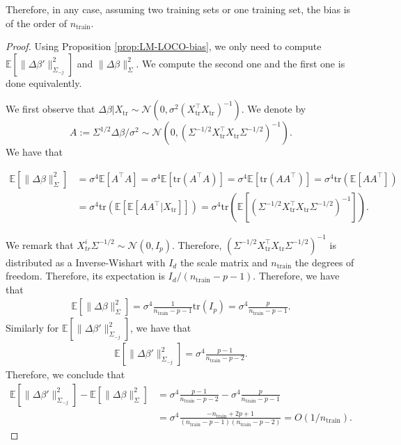 \documentclass{article}
\theoremstyle{plain}
\theoremstyle{definition}
\theoremstyle{remark}
\newcommand{\e}[1]{\mathbb{E}\left[#1\right]  } %
\begin{document}
Therefore, in any case, assuming two training sets or one training set, the bias is of the order of $n_\mathrm{train}$.

\begin{proof}
Using Proposition \ref{prop:LM-LOCO-bias}, we only need to compute $\e{\|\Delta\beta'\|^2_{\Sigma_{-j}}}$ and $\|\Delta\beta\|^2_\Sigma$. We compute the second one and the first one is done equivalently.

We first observe that $\Delta\beta| X_\mathrm{tr}\sim\mathcal{N}(0, \sigma^2(X_\mathrm{tr}^\top X_\mathrm{tr})^{-1})$. We denote by $$A:=\Sigma^{1/2}\Delta\beta/\sigma^2\sim \mathcal{N}(0, (\Sigma^{-1/2}X_\mathrm{tr}^\top X_\mathrm{tr}\Sigma^{-1/2})^{-1}).$$ We have that 

\begin{align*}
    \e{\|\Delta\beta\|^2_{\Sigma}}&= \sigma^4\e{A^\top A} = \sigma^4 \e{\mathrm{tr}(A^\top A)}= \sigma^4 \e{\mathrm{tr}(A A^\top)} = 
    \sigma^4 \mathrm{tr}(\e{A A^\top})\\&=  \sigma^4 \mathrm{tr}(\e{\e{A A^\top|X_\mathrm{tr}}})=  \sigma^4 \mathrm{tr}(\e{(\Sigma^{-1/2}X_\mathrm{tr}^\top X_\mathrm{tr}\Sigma^{-1/2})^{-1}}).
\end{align*}

We remark that $X_{tr}^i\Sigma^{-1/2}\sim \mathcal{N}(0, I_{p})$. 
Therefore, $(\Sigma^{-1/2}X_\mathrm{tr}^\top X_\mathrm{tr}\Sigma^{-1/2})^{-1}$ is distributed as a Inverse-Wishart with $I_d$ the scale matrix and $n_\mathrm{train}$ the degrees of freedom. Therefore, its expectation is $I_d/(n_\mathrm{train}-p-1)$. Therefore, we have that 
\begin{align*}
    \e{\|\Delta\beta\|^2_{\Sigma}} = \sigma^4\frac{1}{n_\mathrm{train}-p-1}\mathrm{tr}(I_p)=\sigma^4\frac{p}{n_\mathrm{train}-p-1}.
\end{align*}
Similarly for $\e{\|\Delta\beta'\|^2_{\Sigma_{-j}}}$, we have that 
\begin{align*}
    \e{\|\Delta\beta'\|^2_{\Sigma_{-j}}} = \sigma^4\frac{p-1}{n_\mathrm{train}-p-2}.
\end{align*}
Therefore, we conclude that 
\begin{align*}
    \e{\|\Delta\beta'\|^2_{\Sigma_{-j}}} - \e{\|\Delta\beta\|^2_{\Sigma}}&=\sigma^4\frac{p-1}{n_\mathrm{train} -p-2}- \sigma^4\frac{p}{n_\mathrm{train}-p-1}\\&=\sigma^4\frac{-n_\mathrm{train}+2p+1}{(n_\mathrm{train}-p-1)(n_\mathrm{train}-p-2)}=O(1/n_\mathrm{train}).
\end{align*}

\end{proof}
\end{document}
